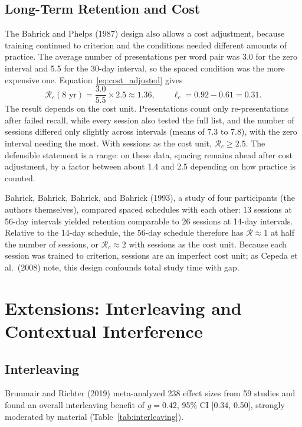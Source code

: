 \documentclass[10pt,twocolumn]{article}
\newcommand{\effr}{\mathcal{R}}
\newcommand{\lr}{\ell}
\begin{document}
\subsection{Long-Term Retention and Cost}
\label{sec:longterm}

The Bahrick and Phelps (1987) design also allows a cost adjustment, because training continued to criterion and the conditions needed different amounts of practice. The average number of presentations per word pair was 3.0 for the zero interval and 5.5 for the 30-day interval, so the spaced condition was the more expensive one. Equation~\ref{eq:cost_adjusted} gives
\[
\effr_c(8\text{ yr}) = \frac{3.0}{5.5} \times 2.5 \approx 1.36, \qquad \lr_c = 0.92 - 0.61 = 0.31.
\]
The result depends on the cost unit. Presentations count only re-presentations after failed recall, while every session also tested the full list, and the number of sessions differed only slightly across intervals (means of 7.3 to 7.8), with the zero interval needing the most. With sessions as the cost unit, $\effr_c \geq 2.5$. The defensible statement is a range: on these data, spacing remains ahead after cost adjustment, by a factor between about 1.4 and 2.5 depending on how practice is counted.

Bahrick, Bahrick, Bahrick, and Bahrick (1993), a study of four participants (the authors themselves), compared spaced schedules with each other: 13 sessions at 56-day intervals yielded retention comparable to 26 sessions at 14-day intervals. Relative to the 14-day schedule, the 56-day schedule therefore has $\effr \approx 1$ at half the number of sessions, or $\effr_c \approx 2$ with sessions as the cost unit. Because each session was trained to criterion, sessions are an imperfect cost unit; as Cepeda et al.\ (2008) note, this design confounds total study time with gap.

\section{Extensions: Interleaving and Contextual Interference}

\subsection{Interleaving}

Brunmair and Richter (2019) meta-analyzed 238 effect sizes from 59 studies and found an overall interleaving benefit of $g = 0.42$, 95\% CI [0.34, 0.50], strongly moderated by material (Table~\ref{tab:interleaving}).
\end{document}
